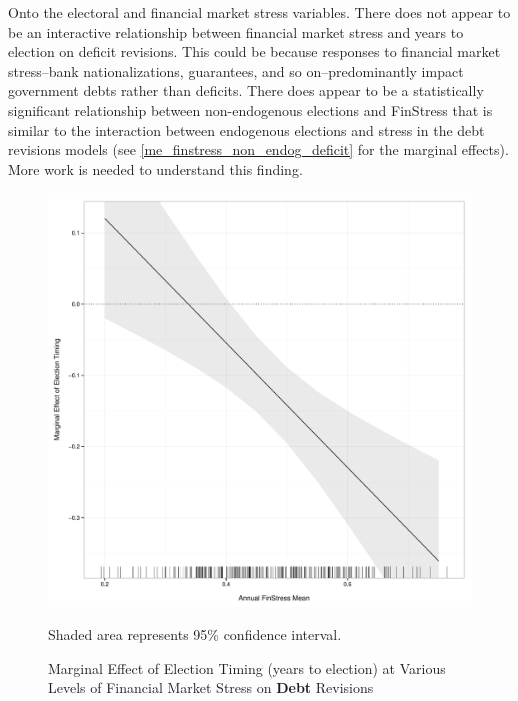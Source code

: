 \documentclass[]{article}
\begin{document}
Onto the electoral and financial market stress variables. There does not appear to be an interactive relationship between financial market stress and years to election on deficit revisions. This could be because responses to financial market stress--bank nationalizations, guarantees, and so on--predominantly impact government debts rather than deficits. There does appear to be a statistically significant relationship between non-endogenous elections and FinStress that is similar to the interaction between endogenous elections and stress in the debt revisions models (see \ref{me_finstress_non_endog_deficit} for the marginal effects). More work is needed to understand this finding.

\begin{landscape}
    
\end{landscape}

\begin{landscape}
    
\end{landscape}


\begin{figure}
    \caption{Marginal Effect of Election Timing (years to election) at Various Levels of Financial Market Stress on \textbf{Debt} Revisions}
    \label{me_finstress_elect}

    \begin{center}
        \includegraphics[scale=0.4]{figures/finstress_elect_me.pdf}
    \end{center}

	{\scriptsize{Shaded area represents 95\% confidence interval.}}

\end{figure}
\end{document}
